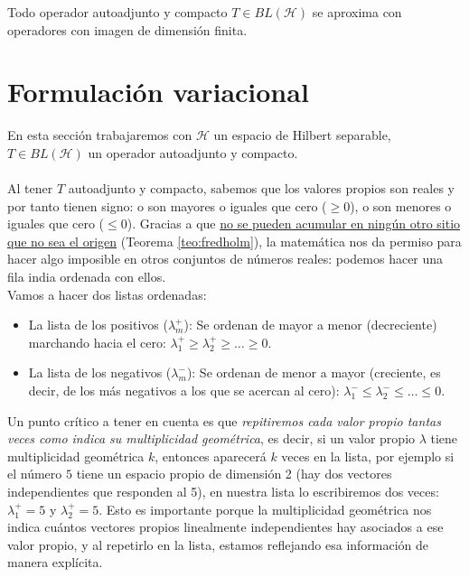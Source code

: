 \documentclass[12pt]{book}
\begin{document}
\begin{prop}
    Todo operador autoadjunto y compacto $T\in BL(\mathcal{H})$ se aproxima con operadores con imagen de dimensión finita.
\end{prop}

\section{Formulación variacional}

\noindent
En esta sección trabajaremos con $\mathcal{H}$ un espacio de Hilbert separable, $T\in BL(\mathcal{H})$ un operador autoadjunto y compacto. \\ \\
\noindent
Al tener $T$ autoadjunto y compacto, sabemos que los valores propios son reales y por tanto tienen signo: o son mayores o iguales que cero ($\geq 0$), o son menores o iguales que cero ($\leq 0$). Gracias a que \underline{no se pueden acumular en ningún otro sitio que no sea el origen} (Teorema \ref{teo:fredholm}), la matemática nos da permiso para hacer algo imposible en otros conjuntos de números reales: podemos hacer una fila india ordenada con ellos. \\
\noindent
Vamos a hacer dos listas ordenadas:
\begin{itemize}
    \item La lista de los positivos ($\lambda_m^+$): Se ordenan de mayor a menor (decreciente) marchando hacia el cero: $\lambda_1^+ \geq \lambda_2^+ \geq \dots \geq 0$.
    \item La lista de los negativos ($\lambda_m^-$): Se ordenan de menor a mayor (creciente, es decir, de los más negativos a los que se acercan al cero): $\lambda_1^- \leq \lambda_2^- \leq \dots \leq 0$.
\end{itemize}
Un punto crítico a tener en cuenta es que \textit{repitiremos cada valor propio tantas veces como indica su multiplicidad geométrica}, es decir, si un valor propio $\lambda$ tiene multiplicidad geométrica $k$, entonces aparecerá $k$ veces en la lista, por ejemplo si el número $5$ tiene un espacio propio de dimensión 2 (hay dos vectores independientes que responden al 5), en nuestra lista lo escribiremos dos veces: $\lambda_1^+ = 5$ y $\lambda_2^+ = 5$. Esto es importante porque la multiplicidad geométrica nos indica cuántos vectores propios linealmente independientes hay asociados a ese valor propio, y al repetirlo en la lista, estamos reflejando esa información de manera explícita. \\ \\
\end{document}
